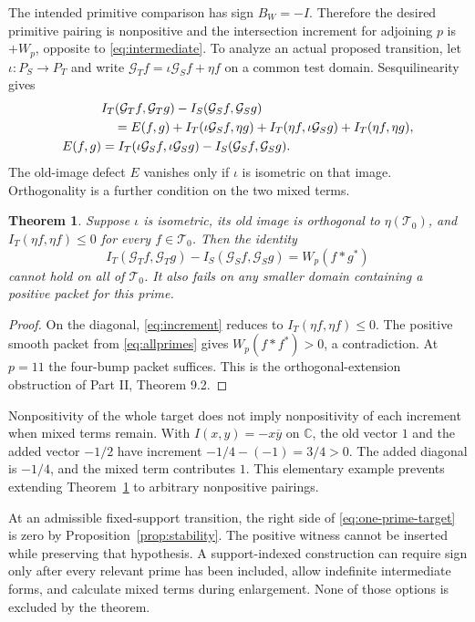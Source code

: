 \documentclass[11pt,letterpaper]{article}
\newtheorem{theorem}{Theorem}[section]
\theoremstyle{definition}
\theoremstyle{remark}
\newcommand{\C}{\mathbb C}
\newcommand{\T}{\mathcal T}
\begin{document}
The intended primitive comparison has sign $B_W=-I$.
Therefore the desired primitive pairing is nonpositive and the
intersection increment for adjoining $p$ is $+W_p$, opposite to
\eqref{eq:intermediate}. To analyze an actual proposed transition,
let $\iota:P_S\to P_T$ and write
$\mathcal G_Tf=\iota\mathcal G_Sf+\eta f$ on a common test domain.
Sesquilinearity gives
\begin{align}
 &I_T(\mathcal G_Tf,\mathcal G_Tg)-I_S(\mathcal G_Sf,\mathcal G_Sg)\notag\\
 &\quad=E(f,g)+I_T(\iota\mathcal G_Sf,\eta g)
       +I_T(\eta f,\iota\mathcal G_Sg)+I_T(\eta f,\eta g),
 \label{eq:increment}\\
 E(f,g)&=I_T(\iota\mathcal G_Sf,\iota\mathcal G_Sg)
                       -I_S(\mathcal G_Sf,\mathcal G_Sg).
 \label{eq:E}
\end{align}
The old-image defect $E$ vanishes only if $\iota$ is isometric
on that image. Orthogonality is a further condition on the two
mixed terms.

\begin{theorem}\label{thm:orthogonal}
Suppose $\iota$ is isometric, its old image is orthogonal to
$\eta(\T_0)$, and $I_T(\eta f,\eta f)\le0$ for every
$f\in\T_0$. Then the identity
\begin{equation}
 I_T(\mathcal G_Tf,\mathcal G_Tg)-I_S(\mathcal G_Sf,\mathcal G_Sg)
                    =W_p(f*g^*)
 \label{eq:one-prime-target}
\end{equation}
cannot hold on all of $\T_0$. It also fails on any smaller
domain containing a positive packet for this prime.
\end{theorem}
\begin{proof}
On the diagonal, \eqref{eq:increment} reduces to
$I_T(\eta f,\eta f)\le0$. The positive smooth packet from
\eqref{eq:allprimes} gives $W_p(f*f^*)>0$, a contradiction.
At $p=11$ the four-bump packet suffices. This is the
orthogonal-extension obstruction of Part II, Theorem 9.2.
\end{proof}

Nonpositivity of the whole target does not imply nonpositivity
of each increment when mixed terms remain. With
$I(x,y)=-x\overline y$ on $\C$, the old vector $1$ and the
added vector $-1/2$ have increment $-1/4-(-1)=3/4>0$.
The added diagonal is $-1/4$, and the mixed term contributes
$1$. This elementary example prevents extending
Theorem~\ref{thm:orthogonal} to arbitrary nonpositive pairings.

At an admissible fixed-support transition, the right side of
\eqref{eq:one-prime-target} is zero by
Proposition~\ref{prop:stability}. The positive witness cannot be
inserted while preserving that hypothesis. A support-indexed
construction can require sign only after every relevant prime
has been included, allow indefinite intermediate forms, and
calculate mixed terms during enlargement. None of those options
is excluded by the theorem.
\end{document}
